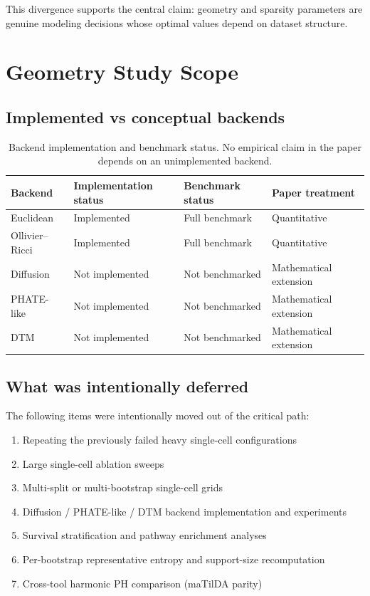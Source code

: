 \documentclass[11pt]{article}
\begin{document}
This divergence supports the central claim: geometry and sparsity parameters are genuine modeling decisions whose optimal values depend on dataset structure.

\section{Geometry Study Scope}

\subsection{Implemented vs conceptual backends}

\begin{table}[h]
\centering
\small
\begin{tabular}{llll}
\toprule
Backend & Implementation status & Benchmark status & Paper treatment \\
\midrule
Euclidean & Implemented & Full benchmark & Quantitative \\
Ollivier--Ricci & Implemented & Full benchmark & Quantitative \\
Diffusion & Not implemented & Not benchmarked & Mathematical extension \\
PHATE-like & Not implemented & Not benchmarked & Mathematical extension \\
DTM & Not implemented & Not benchmarked & Mathematical extension \\
\bottomrule
\end{tabular}
\caption{Backend implementation and benchmark status.
No empirical claim in the paper depends on an unimplemented backend.}
\label{tab:backendstatus}
\end{table}

\subsection{What was intentionally deferred}

The following items were intentionally moved out of the critical path:
\begin{enumerate}[leftmargin=1.5em]
\item Repeating the previously failed heavy single-cell configurations
\item Large single-cell ablation sweeps
\item Multi-split or multi-bootstrap single-cell grids
\item Diffusion / PHATE-like / DTM backend implementation and experiments
\item Survival stratification and pathway enrichment analyses
\item Per-bootstrap representative entropy and support-size recomputation
\item Cross-tool harmonic PH comparison (maTilDA parity)
\end{enumerate}
\end{document}
